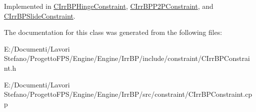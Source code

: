 Implemented in \hyperlink{class_c_irr_b_p_hinge_constraint_a8c9ba8b2ee3bdff9ea684f2200c302ce}{CIrrBPHingeConstraint}, \hyperlink{class_c_irr_b_p_p2_p_constraint_abc3ec07fbc260cb8f88727fd8e9fc2c6}{CIrrBPP2PConstraint}, and \hyperlink{class_c_irr_b_p_slide_constraint_acaaf3cfaba14b8c126ab548f7c21c2b6}{CIrrBPSlideConstraint}.



The documentation for this class was generated from the following files:\begin{DoxyCompactItemize}
\item 
E:/Documenti/Lavori Stefano/ProgettoFPS/Engine/Engine/IrrBP/include/constraint/CIrrBPConstraint.h\item 
E:/Documenti/Lavori Stefano/ProgettoFPS/Engine/Engine/IrrBP/src/constraint/CIrrBPConstraint.cpp\end{DoxyCompactItemize}
